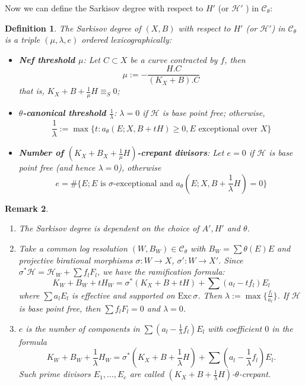 \documentclass[11pt]{amsart}
\newtheorem{defn}{Definition}[section]
\newtheorem{rmk}[defn]{Remark}
\begin{document}
Now we can define the Sarkisov degree  with respect to $H'$ (or $\mathcal{H}'$ ) in $\mathcal{C}_{\theta}$:
\begin{defn}\label{sarkisovdegree}
  \cite[Definition 3.8]{brunoLogSarkisovProgram1995}
  The Sarkisov degree of $ (X,B) $ with respect to $ H' $ (or $ \mathcal{H}' $) in $ \mathcal{C}_\theta $ is a triple $ (\mu,\lambda,e) $ ordered lexicographically:
  \begin{itemize}
    \item \textbf{Nef threshold $ \mu $}: Let $ C\subset X  $ be a curve contracted by $ f $, then 
      \[ \mu:=-\frac{H.C}{(K_X+B).C} \]
      that is, $ K_X+B+\frac{1}{\mu} H \equiv_S0$;
    \item \textbf{$ \theta $-canonical threshold  $ \frac{1}{\lambda} $}: $\lambda=0$ if $ \mathcal{H} $ is base point free; otherwise,
      \[ \frac{1}{\lambda}:=\max\{t:a_{\theta}(E;X,B+tH)\geqslant 0 ,E\text{ exceptional over }X \}\] 
    \item \textbf{Number of $(K_{X}+B_{X}+\frac{1}{\mu}H)$-crepant divisors}: Let $ e=0 $ if $ \mathcal{H} $ is base point free (and hence $ \lambda=0 $), otherwise 
      \[ e=\#\{E; E \text{ is }\sigma\text{-exceptional and } a_{\theta}(E;X,B+\frac{1}{\lambda} H)=0 \} \]
  \end{itemize}
\end{defn}
\begin{rmk} 
 \begin{enumerate}
    \item  The Sarkisov degree is dependent on the choice of  $A', H'$ and  $\theta$.
   \item Take a common log resolution  $ (W,B_W)\in \mathcal{C}_\theta $ with $ B_W=\sum \theta(E)E $ and projective birational morphisms $ \sigma:W\to X $, $ \sigma':W\to X' $. Since $\sigma^*\mathcal{H}=\mathcal{H}_W+\sum f_{l}F_{l}$, we have the ramification formula:
      \[ K_W+B_W+tH_W=\sigma^*(K_X+B+tH)+\sum(a_l-tf_l)E_l \]
      where $ \sum a_lE_l $ is effective and supported on $ \mathrm{Exc}\,\sigma $. Then $\lambda:=\max\{ \frac{f_l}{a_l}\}$. If $ \mathcal{H} $ is base point free, then $ \sum f_lF_l=0 $ and $\lambda=0  $.
      \item   $ e $ is the number of components in $\sum(a_l-\frac{1}{\lambda}f_l)E_l$ with coefficient $ 0 $ in the formula
      \[ K_W+B_W+\frac{1}{\lambda} H_W=\sigma^*(K_X+B+\frac{1}{\lambda} H)+\sum(a_l-\frac{1}{\lambda} f_l)E_l .\]
      Such prime divisors $E_{1},\ldots, E_{e}$ are called $(K_{X}+B+\frac{1}{\lambda}H)$-$\theta$-crepant.
 \end{enumerate} 
\end{rmk}
\end{document}
